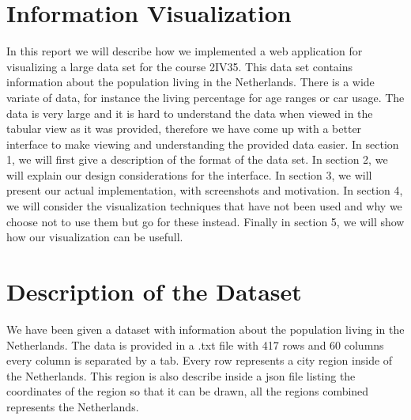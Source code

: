 \documentclass[a4paper,twoside,11pt]{article}
\begin{document}
\section*{Information Visualization}
In this report we will describe how we implemented a web application for visualizing a large data set for the course 2IV35. This data set contains information about the population living in the Netherlands.  \newline
There is a wide variate of data, for instance the living percentage for age ranges or car usage. The data is very large and it is hard to understand the data when viewed in the tabular view as it was provided, therefore we have come up with a better interface to make viewing and understanding the provided data easier. \newline
In section 1, we will first give a description of the format of the data set. \newline
In section 2, we will explain our design considerations for the interface. \newline
In section 3, we will present our actual implementation, with screenshots and motivation. \newline
In section 4, we will consider the visualization techniques that have not been used and why we choose not to use them but go for these instead. \newline
Finally in section 5, we will show how our visualization can be usefull. \newline
\newpage
\section{Description of the Dataset}
We have been given a dataset with information about the population living in the Netherlands. The data is provided in a .txt file with 417 rows and 60 columns every column is separated by a tab. Every row represents a city region inside of the Netherlands. This region is also describe inside a json file listing the coordinates of the region so that it can be drawn, all the regions combined represents the Netherlands.
\end{document}
